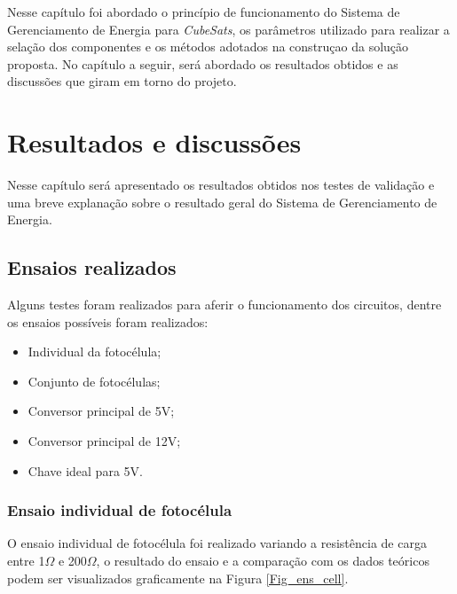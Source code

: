 \documentclass[
	12pt,				%
	openright,			%
	oneside,			%
	a4paper,			%
	english,			%
	french,				%
	spanish,			%
	brazil,				%
	oldfontcommands
	]{abntex2}
\begin{document}
	Nesse capítulo foi abordado o princípio de funcionamento do Sistema de Gerenciamento de Energia para \textit{CubeSats}, os parâmetros utilizado para realizar a selação dos componentes e os métodos adotados na construçao da solução proposta. No capítulo a seguir, será abordado os resultados obtidos e as discussões que giram em torno do projeto.
	
	
\chapter[Resultados e discussões]{Resultados e discussões}

	Nesse capítulo será apresentado os resultados obtidos nos testes de validação e uma breve explanação sobre o resultado geral do Sistema de Gerenciamento de Energia.
	
\section[Ensaios realizados]{Ensaios realizados}

	Alguns testes foram realizados para aferir o funcionamento dos circuitos, dentre os ensaios possíveis foram realizados:
	
	\begin{itemize}
	\item Individual da fotocélula;
		\item Conjunto de fotocélulas;
		\item Conversor principal de 5V;
		\item Conversor principal de 12V;
		\item Chave ideal para 5V.		
	\end{itemize}
	
\subsection[Ensaio individual de fotocélula]{Ensaio individual de fotocélula}

	O ensaio individual de fotocélula foi realizado variando a resistência de carga entre 1$\Omega$ e 200$\Omega$, o resultado do ensaio e a comparação com os dados teóricos podem ser visualizados graficamente na Figura \ref{Fig_ens_cell}.
	
\end{document}
